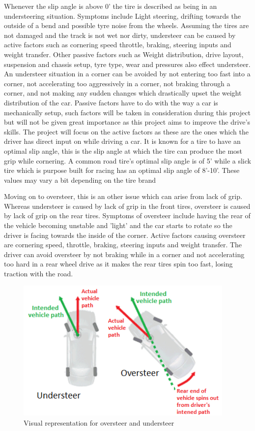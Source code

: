 Whenever the slip angle is above 0’ the tire is described as being in an understeering situation. Symptoms include Light steering, drifting towards the outside of a bend and possible tyre noise from the wheels. Assuming the tires are not damaged and the track is not wet nor dirty, understeer can be caused by active factors such as cornering speed throttle, braking, steering inputs and weight transfer. Other passive factors such as Weight distribution, drive layout, suspension and chassis setup, tyre type, wear and pressures also effect understeer. An understeer situation in a corner can be avoided by not entering too fast into a corner, not accelerating too aggressively in a corner, not braking through a corner, and not making any sudden changes which drastically upset the weight distribution of the car. Passive factors have to do with the way a car is mechanically setup, such factors will be taken in consideration during this project but will not be given great importance as this project aims to improve the drive’s skills. The project will focus on the active factors as these are the ones which the driver has direct input on while driving a car. It is known for a tire to have an optimal slip angle, this is the slip angle at which the tire can produce the most grip while cornering. A common road tire’s optimal slip angle is of 5’ while a slick tire which is purpose built for racing has an optimal slip angle of 8’-10’. These values may vary a bit depending on the tire brand\cite{beckman1991physics}

Moving on to oversteer, this is an other issue which can arise from lack of grip. Whereas understeer is caused by lack of grip in the front tires, oversteer is caused by lack of grip on the rear tires. Symptoms of oversteer include having the rear of the vehicle becoming unstable and 'light' and the car starts to rotate so the driver is facing towards the inside of the corner. Active factors causing oversteer are cornering speed, throttle, braking, steering inputs and weight transfer. The driver can avoid oversteer by not braking while in a corner and not accelerating too hard in a rear wheel drive as it makes the rear tires spin too fast, losing traction with the road.

\begin{figure}[!htb]
	\centering
	\includegraphics[height=7cm]{images/overundersteer}
	\caption{Visual representation for oversteer and understeer}
	\label{fig:slipangle}
\end{figure}

